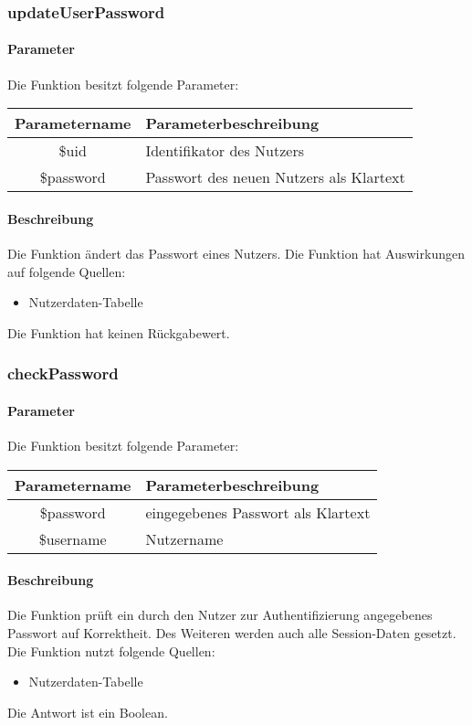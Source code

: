 \subsubsection{updateUserPassword}
\paragraph{Parameter} Die Funktion besitzt folgende Parameter:
\begin{table}[H]
	\begin{tabular}{|c|p{11cm}|}
		\hline
		\textbf{Parametername} & \textbf{Parameterbeschreibung} \\ \hline
		\$uid      & Identifikator des Nutzers \\ \hline
		\$password & Passwort des neuen Nutzers als Klartext \\ \hline
	\end{tabular}
\end{table}
\paragraph{Beschreibung} Die Funktion ändert das Passwort eines Nutzers. Die Funktion hat Auswirkungen auf folgende Quellen:
\begin{itemize}
	\item Nutzerdaten-Tabelle
\end{itemize}
Die Funktion hat keinen Rückgabewert.
\subsubsection{checkPassword}
\paragraph{Parameter} Die Funktion besitzt folgende Parameter:
\begin{table}[H]
	\begin{tabular}{|c|p{11cm}|}
		\hline
		\textbf{Parametername} & \textbf{Parameterbeschreibung} \\ \hline
		\$password & eingegebenes Passwort als Klartext \\ \hline
		\$username & Nutzername \\ \hline
	\end{tabular}
\end{table}
\paragraph{Beschreibung} Die Funktion prüft ein durch den Nutzer zur Authentifizierung angegebenes Passwort auf Korrektheit. Des Weiteren werden auch alle Session-Daten gesetzt. Die Funktion nutzt folgende Quellen:
\begin{itemize}
	\item Nutzerdaten-Tabelle
\end{itemize}
Die Antwort ist ein Boolean.
